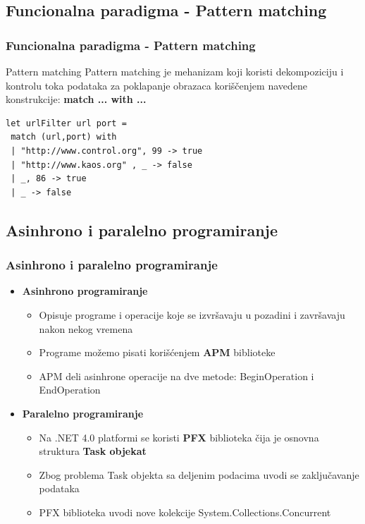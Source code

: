 \documentclass{beamer}
\begin{document}
\subsection*{Funcionalna paradigma - Pattern matching}  
\begin{frame}[fragile]
\frametitle{Funcionalna paradigma - Pattern matching}


\begin{block}{Pattern matching}
Pattern matching je mehanizam koji koristi dekompoziciju i kontrolu toka podataka za poklapanje obrazaca koriščenjem navedene konstrukcije:
\textbf{ match ... with ...}
\end{block}
\begin{lstlisting}
let urlFilter url port =
 match (url,port) with
 | "http://www.control.org", 99 -> true
 | "http://www.kaos.org" , _ -> false
 | _, 86 -> true
 | _ -> false
\end{lstlisting} 

\end{frame}

\subsection*{Asinhrono i paralelno programiranje}
\begin{frame}[fragile]
\frametitle{Asinhrono i paralelno programiranje}

\begin{itemize}
\item \textbf{Asinhrono programiranje}
\begin{itemize}
	\item Opisuje programe i operacije koje se izvršavaju u pozadini i završavaju nakon nekog vremena
	\item Programe možemo pisati korišćenjem \textbf{APM} biblioteke
	\item APM deli asinhrone operacije na dve metode: BeginOperation i EndOperation
\end{itemize}

\item \textbf{Paralelno programiranje}
\begin{itemize}
	\item Na .NET 4.0 platformi se koristi \textbf{PFX} biblioteka čija je osnovna struktura \textbf{Task objekat}
	\item Zbog problema Task objekta sa deljenim podacima uvodi se zaključavanje podataka
	\item PFX biblioteka uvodi nove kolekcije System.Collections.Concurrent	
\end{itemize}
\end{itemize}



\end{frame}
\end{document}
